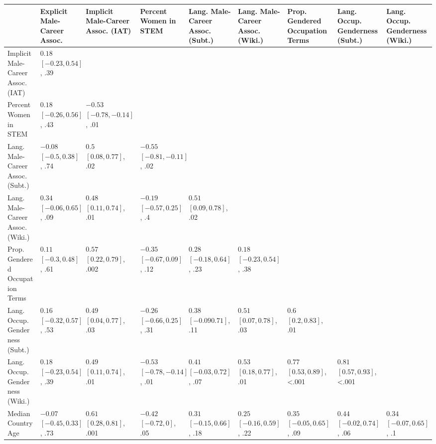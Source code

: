 \documentclass[11pt]{wlscirep}
\begin{document}
 
\begin{tabular}{lp{1.1cm}p{1.1cm}p{1.1cm}p{1.1cm}p{1.1cm}p{1.1cm}p{1.1cm}p{1.1cm}}
&Explicit Male-Career Assoc. & Implicit Male-Career Assoc. (IAT) & Percent Women in STEM & Lang. Male-Career Assoc. (Subt.) & Lang. Male-Career Assoc. (Wiki.) & Prop. Gendered Occupation Terms & Lang. Occup. Genderness (Subt.) & Lang. Occup. Genderness (Wiki.) \\
\midrule
Implicit Male-Career Assoc. (IAT) & {$0.18$ $[-0.23, 0.54]$, .39}&  & &  &  &  &  &\\
\addlinespace

Percent Women in STEM & $0.18$ $[-0.26, 0.56]$, .43 & $-0.53$  $[-0.78, -0.14]$, .01 & &  & &  &  &    \\
\addlinespace

Lang. Male-Career Assoc. (Subt.) & $-0.08$  $[-0.5, 0.38]$, .74 & $0.5$  $[0.08,  0.77]$, .02 & $-0.55$  $[-0.81, -0.11]$, .02 & &  & &  &  \\
\addlinespace

Lang. Male-Career Assoc. (Wiki.) & $0.34$  $[-0.06, 0.65]$, .09 & $0.48$  $[0.11, 0.74]$, .01 & $-0.19$  $[-0.57, 0.25]$, .4 & $0.51$  $[0.09, 0.78]$, .02 & & & &\\
\addlinespace

Prop. Gendered Occupation Terms & $0.11$  $[-0.3, 0.48]$, .61 & $0.57$  $[0.22,  0.79]$, .002 & $-0.35$  $[-0.67, 0.09]$, .12 & $0.28$  $[-0.18, 0.64]$, .23 & $0.18$  $[-0.23, 0.54]$, .38 &  & &\\
\addlinespace

Lang. Occup. Genderness (Subt.) & $0.16$  $[-0.32, 0.57]$, .53 & $0.49$  $[0.04,  0.77]$, .03 & $-0.26$  $[-0.66, 0.25]$, .31 & $0.38$  $[-0.09 0.71]$, .11 & $0.51$  $[0.07, 0.78]$, .03 & $0.6$  $[0.2, 0.83]$, .01 & & \\
\addlinespace

Lang. Occup. Genderness (Wiki.) & $0.18$  $[-0.23, 0.54]$, .39 & $0.49$  $[0.11,  0.74]$, .01 & $-0.53$  $[-0.78, -0.14]$, .01 & $0.41$  $[-0.03, 0.72]$, .07 & $0.53$  $[0.18, 0.77]$, .01 & $0.77$  $[0.53, 0.89]$, <.001 & $0.81$  $[0.57, 0.93]$, <.001 &\\
\addlinespace

Median Country Age & $-0.07$  $[-0.45, 0.33]$, .73 & $0.61$  $[0.28, 0.81]$, .001 & $-0.42$  $[-0.72, 0]$, .05 & $0.31$  $[-0.15, 0.66]$, .18 & $0.25$  $[-0.16, 0.59]$, .22 & $0.35$  $[-0.05, 0.65]$, .09 & $0.44$  $[-0.02, 0.74]$, .06 & $0.34$  $[-0.07, 0.65]$, .1 \\
\bottomrule
\end{tabular}
\hfill
\null
\end{document}
